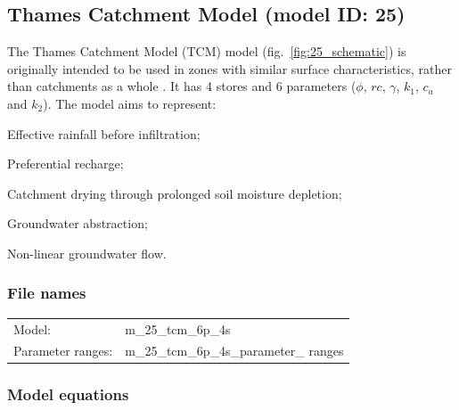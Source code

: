 \subsection{Thames Catchment Model (model ID: 25)}
The Thames Catchment Model (TCM) model (fig.~\ref{fig:25_schematic}) is originally intended to be used in zones with similar surface characteristics, rather than catchments as a whole \citep{Moore2001}. It has 4 stores and 6 parameters ($\phi$, $rc$, $\gamma$, $k_1$, $c_a$ and $k_2$). The model aims to represent:

\begin{itemizecompact}
\item Effective rainfall before infiltration;
\item Preferential recharge;
\item Catchment drying through prolonged soil moisture depletion;
\item Groundwater abstraction;
\item Non-linear groundwater flow.
\end{itemizecompact}

\subsubsection{File names}
\begin{tabular}{@{}ll}
Model: &m\_25\_tcm\_6p\_4s \\
Parameter ranges: &m\_25\_tcm\_6p\_4s\_parameter\_ ranges \\
\end{tabular}

\subsubsection{Model equations}

